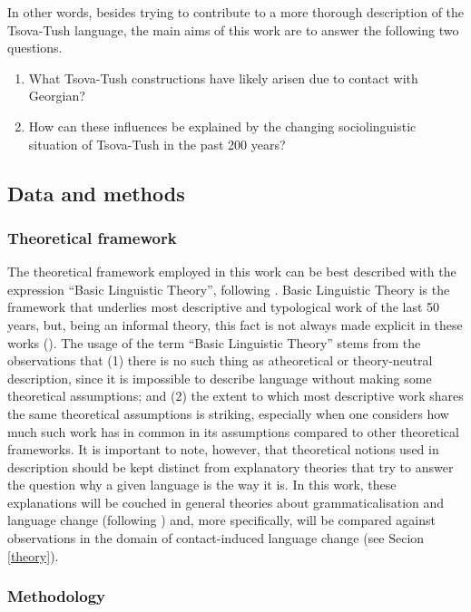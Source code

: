 In other words, besides trying to contribute to a more thorough description of the Tsova-Tush language, the main aims of this work are to answer the following two questions. 

\begin{enumerate}
	\item What Tsova-Tush constructions have likely arisen due to contact with Georgian?
	\item How can these influences be explained by the changing sociolinguistic situation of Tsova-Tush in the past 200 years?
\end{enumerate}



\subsection{Data and methods} \label{methods}

\subsubsection{Theoretical framework}

The theoretical framework employed in this work can be best described with the expression ``Basic Linguistic Theory'', following \textcite{dixon1997blt,dixon2010blt1}. Basic Linguistic Theory is the framework that underlies most descriptive and typological work of the last 50 years, but, being an informal theory, this fact is not always made explicit in these works (\cite{dryer2006blt}). The usage of the term ``Basic Linguistic Theory'' stems from the observations that (1) there is no such thing as atheoretical or theory-neutral description, since it is impossible to describe language without making some theoretical assumptions; and (2) the extent to which most descriptive work shares the same theoretical assumptions is striking, especially when one considers how much such work has in common in its assumptions compared to other theoretical frameworks. It is important to note, however, that theoretical notions used in description should be kept distinct from explanatory theories that try to answer the question why a given language is the way it is. In this work, these explanations will be couched in general theories about grammaticalisation and language change (following \cite{dryer2006blt}) and, more specifically, will be compared against observations in the domain of contact-induced language change (see Secion \ref{theory}).

\subsubsection{Methodology}

